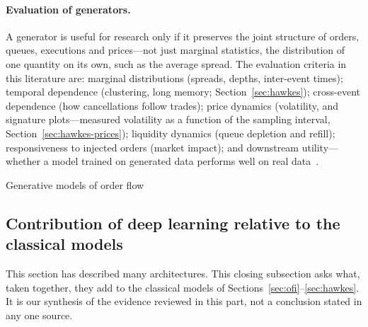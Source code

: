\paragraph{Evaluation of generators.} A generator is useful for research only if it preserves the
joint structure of orders, queues, executions and prices---not just marginal statistics, the distribution of one quantity on its own, such as the
average spread. The evaluation criteria in this literature are: marginal distributions (spreads,
depths, inter-event times); temporal dependence (clustering, long memory; Section~\ref{sec:hawkes}); cross-event dependence
(how cancellations follow trades); price dynamics (volatility, and signature plots---measured volatility as a function of the sampling
interval, Section~\ref{sec:hawkes-prices}); liquidity dynamics
(queue depletion and refill); responsiveness to injected orders (market impact); and downstream
utility---whether a model trained on generated data performs well on real data~\citep{lobbench2025,jain2024sim}.

\begin{modelcard}{Generative models of order flow}
\end{modelcard}

\subsection{Contribution of deep learning relative to the classical models}
\label{sec:deep-adds}

This section has described many architectures. This closing subsection asks what, taken together, they add
to the classical models of Sections~\ref{sec:ofi}--\ref{sec:hawkes}. It is our synthesis of the evidence
reviewed in this part, not a conclusion stated in any one source.

